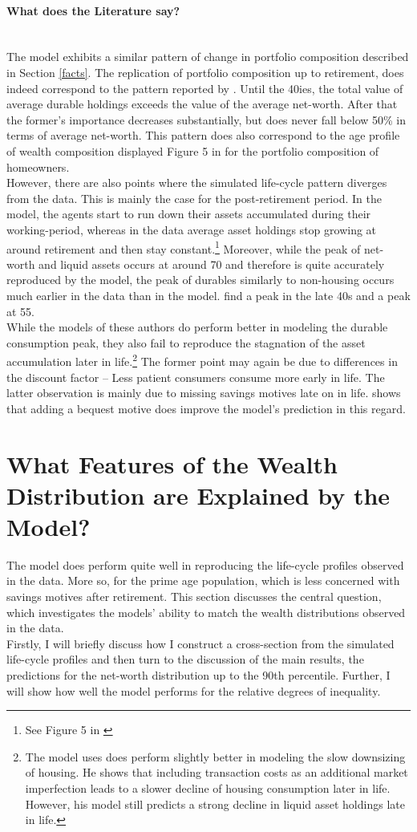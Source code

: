 \documentclass[a4paper,12pt,legno]{article}
\newcommand{\myparagraph}[1]{\paragraph{#1}\mbox{}\\}
\begin{document}
\myparagraph{What does the Literature say?} The model exhibits a similar pattern of change in portfolio composition described in Section \ref{facts}. The replication of portfolio composition up to retirement, does indeed correspond to the pattern reported by \cite{FV&K2011}. Until the 40ies, the total value of average durable holdings exceeds the value of the average net-worth. After that the former's importance decreases substantially, but does never fall below 50\% in terms of average net-worth. This pattern does also correspond to the age profile of wealth composition displayed Figure 5 in \cite{yang2009} for the portfolio composition of homeowners. \\ However, there are also points where the simulated life-cycle pattern diverges from the data. This is mainly the case for the post-retirement period. In the model, the agents start to run down their assets accumulated during their working-period, whereas in the data average asset holdings stop growing at around retirement and then stay constant.\footnote{See Figure 5 in \cite{yang2009}} Moreover, while the peak of net-worth and liquid assets occurs at around 70 and therefore is quite accurately reproduced by the model, the peak of durables similarly to non-housing occurs much earlier in the data than in the model. \cite{FV&K2011} find a peak in the late 40s and \cite{yang2009} a peak at 55. \\
While the models of these authors do perform better in modeling the durable consumption peak, they also fail to reproduce the stagnation of the asset accumulation later in life.\footnote{The model \cite{yang2009} uses does perform slightly better in modeling the slow downsizing of housing. He shows that including transaction costs as an additional market imperfection leads to a slower decline of housing consumption later in life. However, his model still predicts a strong decline in liquid asset holdings late in life.} The former point may again be due to differences in the discount factor \--- Less patient consumers consume more early in life. The latter observation is mainly due to missing savings motives late on in life. \cite{de2004wealth} shows that adding a bequest motive does improve the model's prediction in this regard. 

\section{What Features of the Wealth Distribution are Explained by the Model?}
\label{distribution_model}
The model does perform quite well in reproducing the life-cycle profiles observed in the data. More so, for the prime age population, which is less concerned with savings motives after retirement. This section discusses the central question, which investigates the models' ability to match the wealth distributions observed in the data.\\
Firstly, I will briefly discuss how I construct a cross-section from the simulated life-cycle profiles and then turn to the discussion of the main results, the predictions for the net-worth distribution up to the 90th percentile. Further, I will show how well the model performs for the relative degrees of inequality. 
\end{document}
